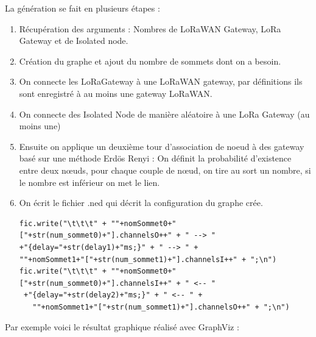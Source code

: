 \documentclass[11pt]{article}
\begin{document}
La génération se fait en plusieurs étapes : 
\begin{enumerate}
\item Récupération des arguments : Nombres de LoRaWAN Gateway, LoRa Gateway et de Isolated node.	
\item Création du graphe et ajout du nombre de sommets dont on a besoin.
\item On connecte les LoRaGateway à une LoRaWAN gateway, par définitions ils sont enregistré à au moins une gateway LoRaWAN.
\item On connecte des Isolated Node de manière aléatoire à une LoRa Gateway (au moins une)
\item Ensuite on applique un deuxième tour d'association de noeud à des gateway 	basé sur une méthode  Erdös Renyi : On définit la probabilité d'existence entre deux nœuds, pour chaque couple de nœud, on tire au sort un nombre, si le nombre est inférieur on met le lien.
\item On écrit le fichier .ned qui décrit la configuration du graphe crée. 

\begin{verbatim}
fic.write("\t\t\t" + ""+nomSommet0+"["+str(num_sommet0)+"].channelsO++" + " --> "
+"{delay="+str(delay1)+"ms;}" + " --> " +
""+nomSommet1+"["+str(num_sommet1)+"].channelsI++" + ";\n")
fic.write("\t\t\t" + ""+nomSommet0+"["+str(num_sommet0)+"].channelsI++" + " <-- "
 +"{delay="+str(delay2)+"ms;}" + " <-- " +
   ""+nomSommet1+"["+str(num_sommet1)+"].channelsO++" + ";\n")
\end{verbatim}

\end{enumerate}
Par exemple voici le résultat graphique réalisé avec GraphViz :
\end{document}
